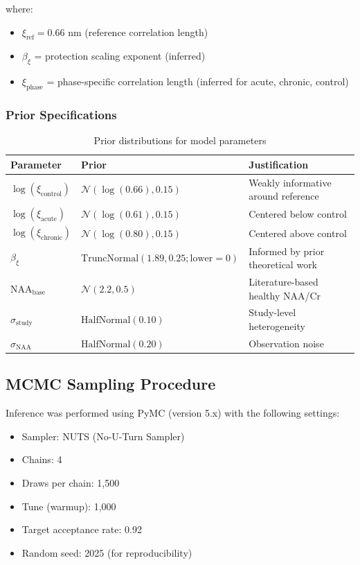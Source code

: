 \documentclass[11pt]{article}
\begin{document}
where:
\begin{itemize}
    \item $\xi_\text{ref} = 0.66$ nm (reference correlation length)
    \item $\beta_\xi$ = protection scaling exponent (inferred)
    \item $\xi_\text{phase}$ = phase-specific correlation length (inferred for acute, chronic, control)
\end{itemize}

\subsubsection{Prior Specifications}

\begin{table}[h]
\centering
\caption{Prior distributions for model parameters}
\begin{tabular}{lll}
\toprule
\textbf{Parameter} & \textbf{Prior} & \textbf{Justification} \\
\midrule
$\log(\xi_\text{control})$ & $\mathcal{N}(\log(0.66), 0.15)$ & Weakly informative around reference \\
$\log(\xi_\text{acute})$ & $\mathcal{N}(\log(0.61), 0.15)$ & Centered below control \\
$\log(\xi_\text{chronic})$ & $\mathcal{N}(\log(0.80), 0.15)$ & Centered above control \\
$\beta_\xi$ & $\text{TruncNormal}(1.89, 0.25; \text{lower}=0)$ & Informed by prior theoretical work \\
$\text{NAA}_\text{base}$ & $\mathcal{N}(2.2, 0.5)$ & Literature-based healthy NAA/Cr \\
$\sigma_\text{study}$ & $\text{HalfNormal}(0.10)$ & Study-level heterogeneity \\
$\sigma_\text{NAA}$ & $\text{HalfNormal}(0.20)$ & Observation noise \\
\bottomrule
\end{tabular}
\end{table}

\subsection{MCMC Sampling Procedure}

Inference was performed using PyMC (version 5.x) with the following settings:
\begin{itemize}
    \item Sampler: NUTS (No-U-Turn Sampler)
    \item Chains: 4
    \item Draws per chain: 1,500
    \item Tune (warmup): 1,000
    \item Target acceptance rate: 0.92
    \item Random seed: 2025 (for reproducibility)
\end{itemize}
\end{document}
